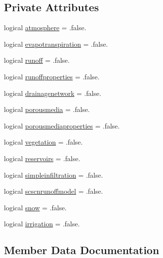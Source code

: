 \subsection*{Private Attributes}
\begin{DoxyCompactItemize}
\item 
logical \mbox{\hyperlink{structmodulebasin_1_1t__coupling_a23297ac6f48564678e81024651c1aa88}{atmosphere}} = .false.
\item 
logical \mbox{\hyperlink{structmodulebasin_1_1t__coupling_a7f2acc789e258a80c5c94f6c95250877}{evapotranspiration}} = .false.
\item 
logical \mbox{\hyperlink{structmodulebasin_1_1t__coupling_a66d3aa72d0e222dbb6a0659b641a0094}{runoff}} = .false.
\item 
logical \mbox{\hyperlink{structmodulebasin_1_1t__coupling_aabfabbcf76fdee2a983ed016f375e815}{runoffproperties}} = .false.
\item 
logical \mbox{\hyperlink{structmodulebasin_1_1t__coupling_aaeffcc8350156f61ec5b9e8cf596bd2c}{drainagenetwork}} = .false.
\item 
logical \mbox{\hyperlink{structmodulebasin_1_1t__coupling_a58aed998a54ab267ffe4869e5d0389d7}{porousmedia}} = .false.
\item 
logical \mbox{\hyperlink{structmodulebasin_1_1t__coupling_a2ee43e91619892d60a9f3d8da9fa0347}{porousmediaproperties}} = .false.
\item 
logical \mbox{\hyperlink{structmodulebasin_1_1t__coupling_a0b38a4bf4efd8df9fa4400d7391d6382}{vegetation}} = .false.
\item 
logical \mbox{\hyperlink{structmodulebasin_1_1t__coupling_a9b5af9a826506437f036d64545c6c58b}{reservoirs}} = .false.
\item 
logical \mbox{\hyperlink{structmodulebasin_1_1t__coupling_af87608d5e6ce6ce75ee44168212458bb}{simpleinfiltration}} = .false.
\item 
logical \mbox{\hyperlink{structmodulebasin_1_1t__coupling_adbc96736f9f1e80eb74a2e9a91486556}{scscnrunoffmodel}} = .false.
\item 
logical \mbox{\hyperlink{structmodulebasin_1_1t__coupling_ae795d24b7b47dae99b43d6781de8209c}{snow}} = .false.
\item 
logical \mbox{\hyperlink{structmodulebasin_1_1t__coupling_a7d86bbdf011d7dc981cf4e11bd30f52e}{irrigation}} = .false.
\end{DoxyCompactItemize}


\subsection{Member Data Documentation}
\mbox{\label{structmodulebasin_1_1t__coupling_a23297ac6f48564678e81024651c1aa88}} 
